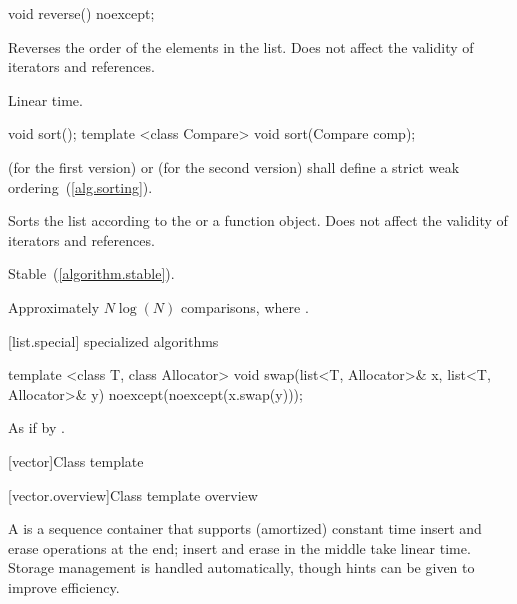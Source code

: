 %
\begin{itemdecl}
void reverse() noexcept;
\end{itemdecl}

\begin{itemdescr}
\pnum
\effects
Reverses the order of the elements in the list.
Does not affect the validity of iterators and references.

\pnum
\complexity
Linear time.
\end{itemdescr}

%
\begin{itemdecl}
void sort();
template <class Compare> void sort(Compare comp);
\end{itemdecl}

\begin{itemdescr}
\pnum
\requires
{}
(for the first
version)
or
(for the second version)
shall define a strict weak ordering~(\ref{alg.sorting}).

\pnum
\effects
Sorts the list according to the  or a  function object.
Does not affect the validity of iterators and references.

\pnum
\remarks Stable~(\ref{algorithm.stable}).

\pnum
\complexity
Approximately
$N \log(N)$
comparisons, where
.
\end{itemdescr}

[list.special]{ specialized algorithms}

%
%
\begin{itemdecl}
template <class T, class Allocator>
  void swap(list<T, Allocator>& x, list<T, Allocator>& y)
    noexcept(noexcept(x.swap(y)));
\end{itemdecl}

\begin{itemdescr}
\pnum
\effects
As if by .
\end{itemdescr}

[vector]{Class template }

[vector.overview]{Class template  overview}

\pnum
{}%
A
is a sequence container that supports
(amortized) constant time insert and erase operations at the end;
insert and erase in the middle take linear time.
Storage management is handled automatically, though hints can be given
to improve efficiency.

